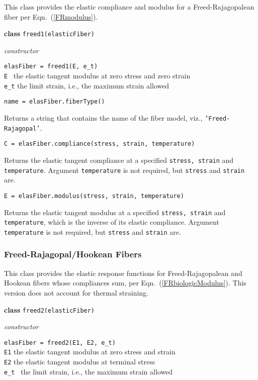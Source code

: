This class provides the elastic compliance and modulus for a Freed-Rajagopalean fiber per Eqn.~(\ref{FRmodulus}).

\bigskip\noindent
\textbf{class} \texttt{freed1(elasticFiber)}

\medskip\noindent
\textit{constructor}

\medskip\noindent
\texttt{elasFiber = freed1(E, e\_t)} \\
\indent \texttt{E} \quad\, the elastic tangent modulus at zero stress and zero strain \\
\indent \texttt{e\_t} \: the limit strain, i.e., the maximum strain allowed

\bigskip\noindent
\texttt{name = elasFiber.fiberType()}

\medskip\noindent
Returns a string that contains the name of the fiber model, viz., \texttt{`Freed-Rajagopal'}.

\medskip\noindent
\texttt{C = elasFiber.compliance(stress, strain, temperature)}

\medskip\noindent
Returns the elastic tangent compliance at a specified \texttt{stress, strain} and \texttt{temperature}.  Argument \texttt{temperature} is not required, but \texttt{stress} and \texttt{strain} are.

\medskip\noindent
\texttt{E = elasFiber.modulus(stress, strain, temperature)}

\medskip\noindent
Returns the elastic tangent modulus at a specified \texttt{stress, strain} and \texttt{temperature}, which is the inverse of its elastic compliance.  Argument \texttt{temperature} is not required, but \texttt{stress} and \texttt{strain} are.


\subsubsection{Freed-Rajagopal\slash Hookean Fibers}

This class provides the elastic response functions for Freed-Rajagopalean and Hookean fibers whose compliances sum, per Eqn.~(\ref{FRbiologicModulus}).  This version does not account for thermal straining.

\bigskip\noindent
\textbf{class} \texttt{freed2(elasticFiber)}

\medskip\noindent
\textit{constructor}

\medskip\noindent
\texttt{elasFiber = freed2(E1, E2, e\_t)} \\
\indent \texttt{E1} \quad\;\;\: the elastic tangent modulus at zero stress and strain \\
\indent \texttt{E2} \quad\;\;\: the elastic tangent modulus at terminal stress \\
\indent \texttt{e\_t} \quad\;\, the limit strain, i.e., the maximum strain allowed 

